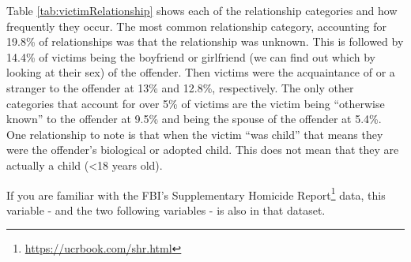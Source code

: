 \documentclass[
]{krantz}
\renewcommand{\href}[2]{#2\footnote{\url{#1}}}
\begin{document}
Table \ref{tab:victimRelationship} shows each of the
relationship categories and how frequently they occur. The
most common relationship category, accounting for 19.8\% of
relationships was that the relationship was unknown. This is
followed by 14.4\% of victims being the boyfriend or
girlfriend (we can find out which by looking at their sex)
of the offender. Then victims were the acquaintance of or a
stranger to the offender at 13\% and 12.8\%, respectively.
The only other categories that account for over 5\% of
victims are the victim being ``otherwise known'' to the
offender at 9.5\% and being the spouse of the offender at
5.4\%. One relationship to note is that when the victim
``was child'' that means they were the offender's biological
or adopted child. This does not mean that they are actually
a child (\textless18 years old).

If you are familiar with the FBI's
\href{https://ucrbook.com/shr.html}{Supplementary Homicide
Report} data, this variable - and the two following
variables - is also in that dataset.
\end{document}
